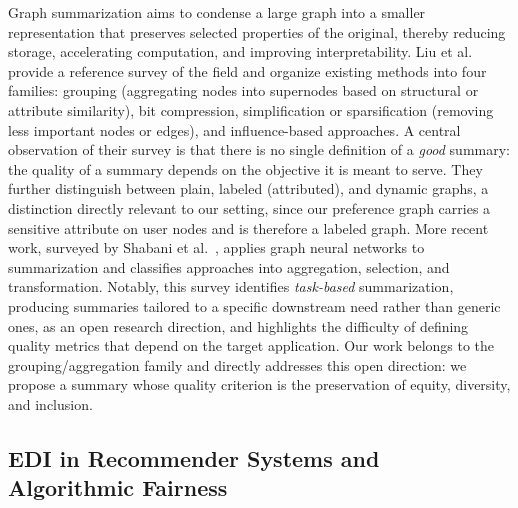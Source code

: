 \documentclass[a4paper,fleqn]{cas-dc}
\begin{document}
Graph summarization aims to condense a large graph into a smaller
representation that preserves selected properties of the original, thereby
reducing storage, accelerating computation, and improving interpretability.
Liu et al.~\citeyearpar{liu_graph_2018} provide a reference survey of the field and
organize existing methods into four families: grouping (aggregating nodes
into supernodes based on structural or attribute similarity), bit compression,
simplification or sparsification (removing less important nodes or edges), and
influence-based approaches. A central observation of their survey is that
there is no single definition of a \emph{good} summary: the quality of a
summary depends on the objective it is meant to serve. They further
distinguish between plain, labeled (attributed), and dynamic graphs, a
distinction directly relevant to our setting, since our preference graph
carries a sensitive attribute on user nodes and is therefore a labeled graph.
More recent work, surveyed by Shabani et
al.~\citeyearpar{shabani_comprehensive_2024}, applies graph neural networks to
summarization and classifies approaches into aggregation, selection, and
transformation. Notably, this survey identifies \emph{task-based}
summarization, producing summaries tailored to a specific downstream need
rather than generic ones, as an open research direction, and highlights the
difficulty of defining quality metrics that depend on the target application.
Our work belongs to the grouping/aggregation family and directly addresses
this open direction: we propose a summary whose quality criterion is the
preservation of equity, diversity, and inclusion.

\subsection{EDI in Recommender Systems and Algorithmic Fairness}
\end{document}
